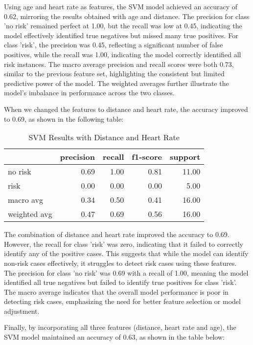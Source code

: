Using age and heart rate as features, the SVM model achieved an accuracy of 0.62, mirroring the results obtained with age and distance. The precision for class 'no risk' remained perfect at 1.00, but the recall was low at 0.45, indicating the model effectively identified true negatives but missed many true positives. For class 'risk', the precision was 0.45, reflecting a significant number of false positives, while the recall was 1.00, indicating the model correctly identified all risk instances. The macro average precision and recall scores were both 0.73, similar to the previous feature set, highlighting the consistent but limited predictive power of the model. The weighted averages further illustrate the model's imbalance in performance across the two classes.

When we changed the features to distance and heart rate, the accuracy improved to 0.69, as shown in the following table:

\FloatBarrier
\begin{table}[H]
\centering
\begin{tabular}{lrrrr}
\toprule
{} & precision & recall & f1-score & support \\
\midrule
no risk & 0.69 & 1.00 & 0.81 & 11.00 \\
risk & 0.00 & 0.00 & 0.00 & 5.00 \\
macro avg & 0.34 & 0.50 & 0.41 & 16.00 \\
weighted avg & 0.47 & 0.69 & 0.56 & 16.00 \\
\bottomrule
\end{tabular}
\caption{SVM Results with Distance and Heart Rate}
\end{table}
\FloatBarrier

The combination of distance and heart rate improved the accuracy to 0.69. However, the recall for class 'risk' was zero, indicating that it failed to correctly identify any of the positive cases. This suggests that while the model can identify non-risk cases effectively, it struggles to detect risk cases using these features. The precision for class 'no risk' was 0.69 with a recall of 1.00, meaning the model identified all true negatives but failed to identify true positives for class 'risk'. The macro average indicates that the overall model performance is poor in detecting risk cases, emphasizing the need for better feature selection or model adjustment.

Finally, by incorporating all three features (distance, heart rate and age), the SVM model maintained an accuracy of 0.63, as shown in the table below:

